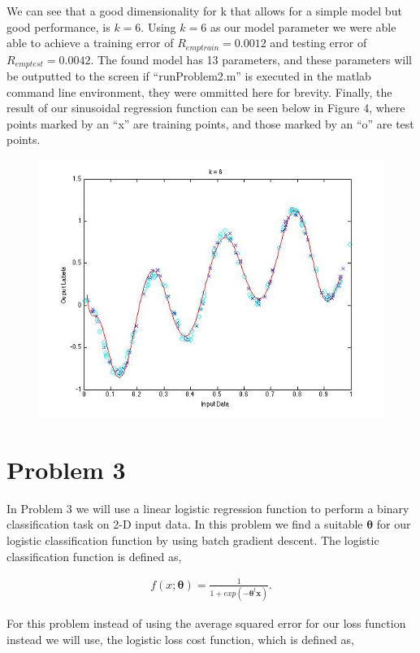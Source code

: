 \documentclass[paper=a4, fontsize=11pt]{scrartcl} %
\numberwithin{equation}{section} %
\numberwithin{figure}{section} %
\numberwithin{table}{section} %
\begin{document}
We can see that a good dimensionality for k that allows for a simple model but good performance, is $k=6$.  Using $k = 6$ as our model parameter we were able able to achieve a training error of $R_{emptrain} = 0.0012$ and testing error of $R_{emptest} = 0.0042$.  The found model has 13 parameters, and these parameters will be outputted to the screen if ``runProblem2.m'' is executed in the matlab command line environment, they were ommitted here for brevity.
Finally, the result of our sinusoidal regression function can be seen below in Figure 4, where points marked by an ``x'' are training points, and those marked by an ``o'' are test points.

\begin{figure}
\centering
\includegraphics[scale=0.4]{prob2curve.jpg}
\end{figure}

\section{Problem 3}

In Problem 3 we will use a linear logistic regression function to perform a binary classification task on 2-D input data.  In this problem we find a suitable $\bm{\theta}$ for our logistic classification function by using batch gradient descent.  The logistic classification function is defined as, 

\begin{align}
f(x;\bm{\theta}) = \frac{1}{1+exp(-\bm{\theta}^t\bm{x})}.
\end{align}

For this problem instead of using the average squared error for our loss function instead we will use, the logistic loss cost function, which is defined as, 
\end{document}
